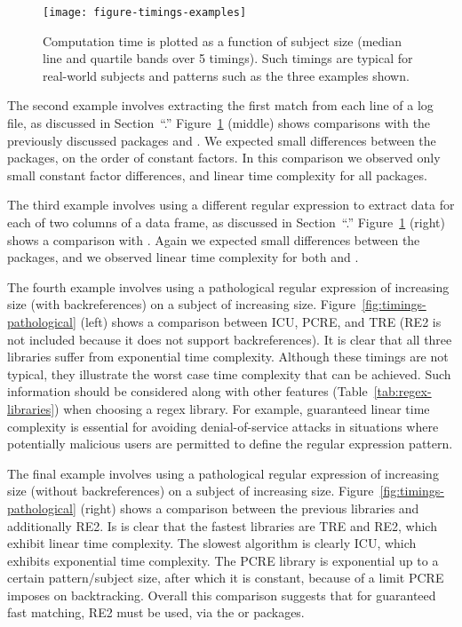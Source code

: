 \begin{figure}
  \texttt{[image: figure-timings-examples]}
  \vskip -0.5cm
  \caption{\label{fig:timings-examples} Computation time is plotted as
    a function of subject size (median line and quartile bands over 5
    timings). Such timings are typical for real-world subjects and patterns such as the three examples shown. }
\end{figure}

The second example involves extracting the first match from each line
of a log file, as discussed in Section~``\sectionrex.''
Figure~\ref{fig:timings-examples} (middle) shows comparisons with the
previously discussed packages and . We expected
small differences between the packages, on the order of constant
factors. In this comparison we observed only small constant factor
differences, and linear time complexity for all packages.

The third example involves using a different regular expression to
extract data for each of two columns of a data frame, as discussed in
Section~``\sectiontidyr.'' Figure~\ref{fig:timings-examples} (right)
shows a comparison with . Again we expected small
differences between the packages, and we observed linear time
complexity for both  and .

The fourth example involves using a pathological regular expression of
increasing size (with backreferences) on a subject of increasing size.
Figure~\ref{fig:timings-pathological} (left) shows a comparison
between ICU, PCRE, and TRE (RE2 is not included because it does not
support backreferences). It is clear that all three libraries suffer
from exponential time complexity.
Although these timings are not typical, they illustrate
the worst case time complexity that can be achieved. Such information
should be considered along with other features
(Table~\ref{tab:regex-libraries}) when choosing a regex library. For
example, guaranteed linear time complexity is essential for avoiding
denial-of-service attacks in situations where potentially malicious
users are permitted to define the regular expression pattern.

The final example involves using a pathological regular expression of
increasing size (without backreferences) on a subject of increasing
size. Figure~\ref{fig:timings-pathological} (right) shows a comparison
between the previous libraries and additionally RE2. Is is clear that
the fastest libraries are TRE and RE2, which exhibit linear time
complexity. The slowest algorithm is clearly ICU, which exhibits
exponential time complexity. The PCRE library is exponential up to a
certain pattern/subject size, after which it is constant, because of a
limit PCRE imposes on backtracking. Overall this comparison suggests
that for guaranteed fast matching, RE2 must be used, via the  or
 packages. 

